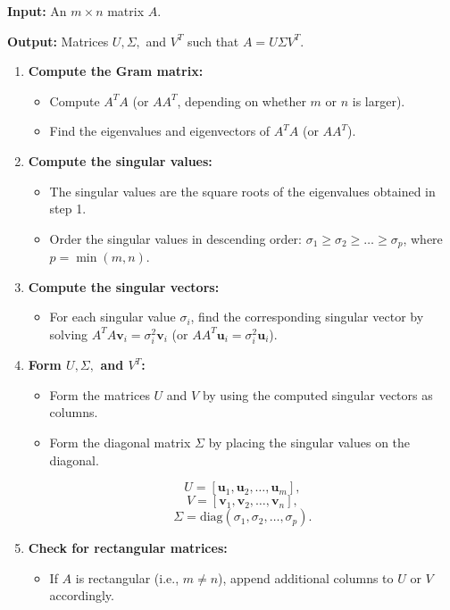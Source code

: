 \textbf{Input:} An \( m \times n \) matrix \( A \).

\textbf{Output:} Matrices \( U, \Sigma, \) and \( V^T \) such that \( A = U \Sigma V^T \).

\begin{enumerate}
    \item \textbf{Compute the Gram matrix:}
        \begin{itemize}
            \item Compute \( A^T A \) (or \( A A^T \), depending on whether \( m \) or \( n \) is larger).
            \item Find the eigenvalues and eigenvectors of \( A^T A \) (or \( A A^T \)).
        \end{itemize}

    \item \textbf{Compute the singular values:}
        \begin{itemize}
            \item The singular values are the square roots of the eigenvalues obtained in step 1.
            \item Order the singular values in descending order: \( \sigma_1 \geq \sigma_2 \geq \ldots \geq \sigma_p \), where \( p = \min(m, n) \).
        \end{itemize}

    \item \textbf{Compute the singular vectors:}
        \begin{itemize}
            \item For each singular value \( \sigma_i \), find the corresponding singular vector by solving \( A^T A \mathbf{v}_i = \sigma_i^2 \mathbf{v}_i \) (or \( A A^T \mathbf{u}_i = \sigma_i^2 \mathbf{u}_i \)).
        \end{itemize}

    \item \textbf{Form \( U, \Sigma, \) and \( V^T \):}
        \begin{itemize}
            \item Form the matrices \( U \) and \( V \) by using the computed singular vectors as columns.
            \item Form the diagonal matrix \( \Sigma \) by placing the singular values on the diagonal.
        \end{itemize}
        \[ U = [\mathbf{u}_1, \mathbf{u}_2, \ldots, \mathbf{u}_m], \]
        \[ V = [\mathbf{v}_1, \mathbf{v}_2, \ldots, \mathbf{v}_n], \]
        \[ \Sigma = \text{diag}(\sigma_1, \sigma_2, \ldots, \sigma_p). \]

    \item \textbf{Check for rectangular matrices:}
        \begin{itemize}
            \item If \( A \) is rectangular (i.e., \( m \neq n \)), append additional columns to \( U \) or \( V \) accordingly.
        \end{itemize}
\end{enumerate}

